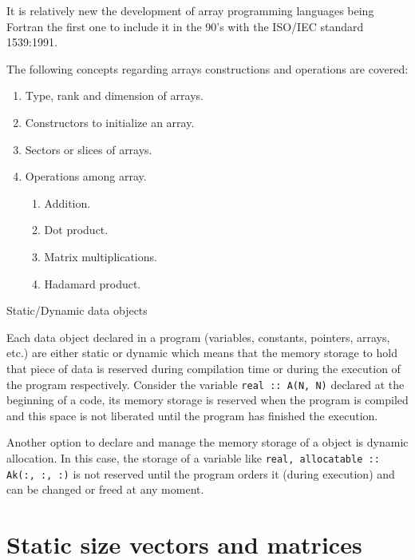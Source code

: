 It is relatively new the development of array programming languages being Fortran the first one to include it in the 90's with the 
ISO/IEC standard 1539:1991. 

The following concepts regarding arrays constructions and operations are covered:

\begin{enumerate} 
    \item Type, rank and dimension of arrays.
    \item Constructors to initialize an array. 
    \item Sectors or slices of arrays. 
    \item Operations among array. 
    
    \begin{enumerate}
        \item Addition. 
        \item Dot product.
        \item Matrix multiplications. 
        \item Hadamard product. 
    \end{enumerate}  
    
\end{enumerate} 



{\Large Static/Dynamic data objects}

Each data object declared in a program (variables, constants, pointers, arrays, etc.) are either static or dynamic 
which means that the memory storage to hold that piece of data is reserved during compilation time or 
during the execution of the program respectively. Consider the variable \texttt{real :: A(N, N)} declared at the 
beginning of a code, its memory storage is reserved when the program is compiled and this space is not liberated 
until the program has finished the execution. 

Another option to declare and manage the memory storage of a object is dynamic allocation. In this case, the 
storage of a variable like \texttt{real, allocatable :: Ak(:, :, :)} is not reserved until 
the program orders it (during execution) and can be changed or freed at any moment.





\newpage 
\section{Static size vectors and matrices} 

